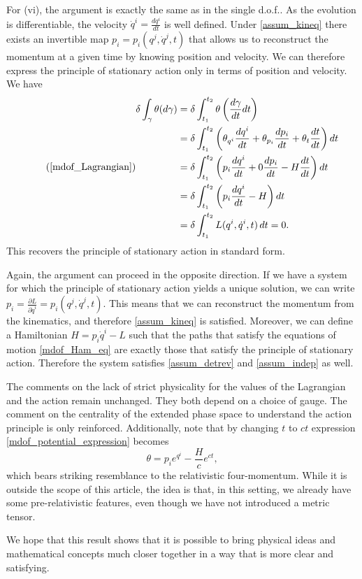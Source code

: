 \documentclass[fleqn,10pt]{wlscirep}
\begin{document}
For (vi), the argument is exactly the same as in the single d.o.f.. As the evolution is differentiable, the velocity $\dot{q}^i = \frac{dq^i}{dt}$ is well defined. Under \ref{assum_kineq} there exists an invertible map $p_i=p_i(q^j, \dot{q}^j, t)$ that allows us to reconstruct the momentum at a given time by knowing position and velocity. We can therefore express the principle of stationary action only in terms of position and velocity. We have
\begin{equation}
\tag*{(\ref{mdof_Lagrangian})}
	\begin{aligned}
		\delta \int_\gamma \theta (d\gamma) &= \delta \int^{t_2}_{t_1} \theta \left(\frac{d\gamma}{dt} dt\right) \\
		&= \delta \int^{t_2}_{t_1} \left(\theta_{q^i} \frac{dq^i}{dt} + \theta_{p_i} \frac{dp_i}{dt} + \theta_t \frac{dt}{dt}\right) dt \\
		&= \delta\int^{t_2}_{t_1} \left(p_i \frac{dq^i}{dt} + 0 \frac{dp_i}{dt} - H \frac{dt}{dt}\right) dt \\
		&= \delta \int^{t_2}_{t_1} \left(p_i \frac{dq^i}{dt} - H\right) dt \\
		&= \delta \int^{t_2}_{t_1} L(q^i, \dot{q}^i, t) \, dt = 0.
	\end{aligned}
\end{equation}
This recovers the principle of stationary action in standard form.

Again, the argument can proceed in the opposite direction. If we have a system for which the principle of stationary action yields a unique solution, we can write $p_i = \frac{\partial L}{\partial \dot{q}^i} = p_i(q^j, \dot{q}^j, t)$. This means that we can reconstruct the momentum from the kinematics, and therefore \ref{assum_kineq} is satisfied. Moreover, we can define a Hamiltonian $H = p_i \dot{q}^i - L$ such that the paths that satisfy the equations of motion \ref{mdof_Ham_eq} are exactly those that satisfy the principle of stationary action. Therefore the system satisfies \ref{assum_detrev} and \ref{assum_indep} as well.

The comments on the lack of strict physicality for the values of the Lagrangian and the action remain unchanged. They both depend on a choice of gauge. The comment on the centrality of the extended phase space to understand the action principle is only reinforced. Additionally, note that by changing $t$ to $ct$ expression \ref{mdof_potential_expression} becomes
\begin{equation}\label{mdof_potential_relativistic}
	\theta = p_i e^{q^i} - \frac{H}{c} e^{ct},
\end{equation}
which bears striking resemblance to the relativistic four-momentum. While it is outside the scope of this article, the idea is that, in this setting, we already have some pre-relativistic features, even though we have not introduced a metric tensor.

We hope that this result shows that it is possible to bring physical ideas and mathematical concepts much closer together in a way that is more clear and satisfying.
\end{document}
